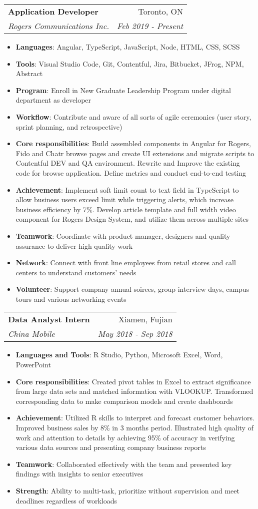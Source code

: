 \documentclass[letterpaper,11pt]{article}
\makeatletter
\newcommand{\resumeItem}[2]{
  \item\small{
    \textbf{#1}{: #2 \vspace{-2pt}}
  }
}
\newcommand{\resumeSubheading}[4]{
  \vspace{-1pt}\item
    \begin{tabular*}{0.97\textwidth}{l@{\extracolsep{\fill}}r}
      \textbf{#1} & #2 \\
      \textit{\small#3} & \textit{\small #4} \\
    \end{tabular*}\vspace{-5pt}
}
\newcommand{\resumeItemListStart}{\begin{itemize}}
\newcommand{\resumeItemListEnd}{\end{itemize}\vspace{-5pt}}
\makeatother
\begin{document}
    \resumeSubheading
      {Application Developer}{Toronto, ON}
      {Rogers Communications Inc.}{Feb 2019 - Present}
      \resumeItemListStart
      \resumeItem{Languages}
          {Angular, TypeScript, JavaScript, Node, HTML, CSS, SCSS}
        \resumeItem{Tools}
          {Visual Studio Code, Git, Contentful, Jira, Bitbucket, JFrog, NPM, Abstract}
        \resumeItem{Program}
          {Enroll in New Graduate Leadership Program under digital department as developer }
        \resumeItem{Workflow}
          {Contribute and aware of all sorts of agile ceremonies (user story, sprint planning, and retrospective)}
        \resumeItem{Core responsibilities}
          {Build assembled components in Angular for Rogers, Fido and Chatr browse pages and create UI extensions and migrate scripts to Contentful DEV and QA environment. Rewrite and Improve the existing code for browse application. Define metrics and conduct end-to-end testing}
         \resumeItem{Achievement}
          {Implement soft limit count to text field in TypeScript to allow business users exceed limit while triggering alerts, which increase business efficiency by 7\%. Develop article template and full width video component for Rogers Design System, and utilize them across multiple sites}
         \resumeItem{Teamwork}
          {Coordinate with product manager, designers and quality assurance to deliver high quality work}
         \resumeItem{Network}
          {Connect with front line employees from retail stores and call centers to understand customers' needs }
          \resumeItem{Volunteer}
          {Support company annual soirees, group interview days, campus tours and various networking events}
      \resumeItemListEnd

    \resumeSubheading
      {Data Analyst Intern}{Xiamen, Fujian}
      {China Mobile}{May 2018 - Sep 2018}
      \resumeItemListStart
        \resumeItem{Languages and Tools}
          {R Studio, Python, Microsoft Excel, Word, PowerPoint }
        \resumeItem{Core responsibilities}
          {Created pivot tables in Excel to extract significance from large data sets and matched information with VLOOKUP. Transformed corresponding data to make comparison models and create dashboards}
         \resumeItem{Achievement}
          {Utilized R skills to interpret and forecast customer behaviors. Improved business sales by 8\% in 3 months period. Illustrated high quality of work and attention to details by achieving 95\% of accuracy in verifying various data sources and presenting company business reports}
        \resumeItem{Teamwork}
          {Collaborated effectively with the team and presented key findings with insights to senior executives }
        \resumeItem{Strength}
          {Ability to multi-task, prioritize without supervision and meet deadlines regardless of workloads}
      \resumeItemListEnd
\end{document}
